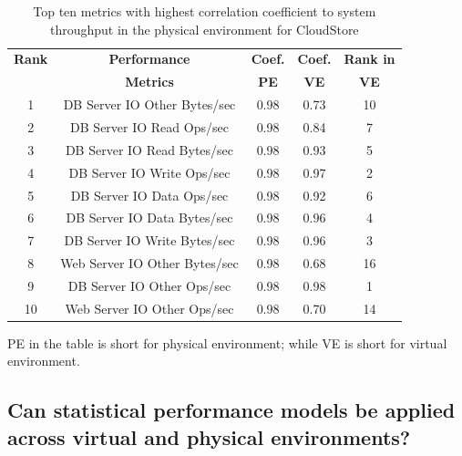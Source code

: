 \documentclass[smallextended]{svjour3}       %
\begin{document}
\begin{table}[tbh]
	\centering
	\caption{Top ten metrics with highest correlation coefficient to system throughput in the physical environment for CloudStore}
	\label{tab:top10csp}
	\begin{threeparttable}
		
		\begin{tabular}{|c||c|c|c|c|}
			\hline
			\textbf{Rank} & \textbf{Performance } & \textbf{Coef. } & \textbf{Coef. } & \textbf{Rank in} \\ %
			& \textbf{ Metrics} & \textbf{PE} & \textbf{VE} & \textbf{VE} \\ %
			\midrule
			\midrule
			1 & DB Server IO Other Bytes/sec & 0.98 & 0.73 & 10 \\ \hline
			2 & DB Server IO Read Ops/sec & 0.98 & 0.84 & 7 \\ \hline
			3 & DB Server IO Read Bytes/sec & 0.98 & 0.93 & 5 \\ \hline
			4 & DB Server IO Write Ops/sec & 0.98 & 0.97 & 2 \\ \hline
			5 & DB Server IO Data Ops/sec & 0.98 & 0.92 & 6 \\ \hline
			6 & DB Server IO Data Bytes/sec & 0.98 & 0.96 & 4 \\ \hline
			7 & DB Server IO Write Bytes/sec & 0.98 & 0.96 & 3 \\ \hline
			8 & Web Server IO Other Bytes/sec & 0.98 & 0.68 & 16 \\ \hline
			9 & DB Server IO Other Ops/sec & 0.98 & 0.98 & 1 \\ \hline
			10 & Web Server IO Other Ops/sec & 0.98 & 0.70 & 14 \\ \hline
		\end{tabular}%
		\begin{tablenotes}
			\item PE in the table is short for physical environment; while VE is short for virtual environment.
		\end{tablenotes}
	\end{threeparttable}
	
	
\end{table}


\subsection{Can statistical performance models be applied across virtual and physical environments?}
\label{sec:model}
 
\end{document}
